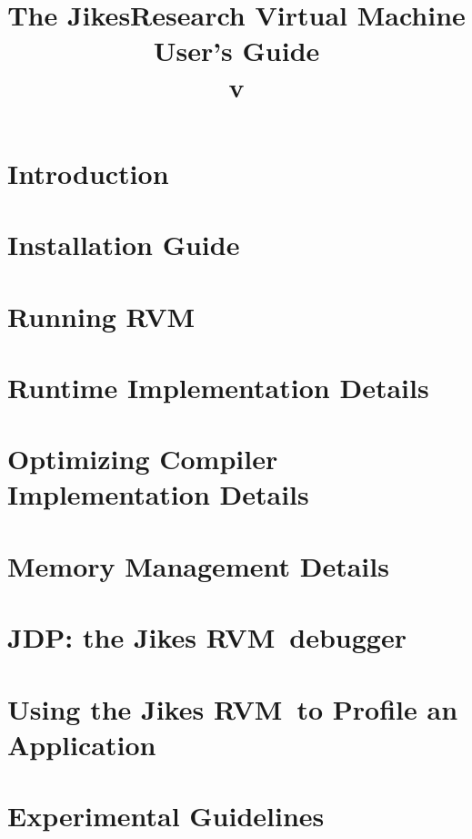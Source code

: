 \documentclass{article}
\title{\texonly{\vfill} {\huge The Jikes\trademark Research Virtual
Machine
\\
User's Guide} \\ {\huge v\version} \\ { } \texonly{\vfill}}
\newcommand{\jrvm}{Jikes RVM}
\begin{document}
\maketitle
\date{}

\T \newpage
\label{hlxtoc}
\T \tableofcontents
\T \listoffigures
\W {}

\T \newpage
\section{Introduction}


\T \newpage
\section{Installation Guide} \label{section:installation}


\T \newpage
\section{Running RVM} \label{section:running}


\T \newpage
\section{Runtime Implementation Details}


\T \newpage
\section{Optimizing Compiler Implementation Details}
\label{section:optdetails}


\T \newpage
\section{Memory Management Details}


\T \newpage
\section{JDP: the \jrvm\ debugger}


\T \newpage
\section{Using the \jrvm\ to Profile an Application}


\T \newpage
\section{Experimental Guidelines}

\end{document}

